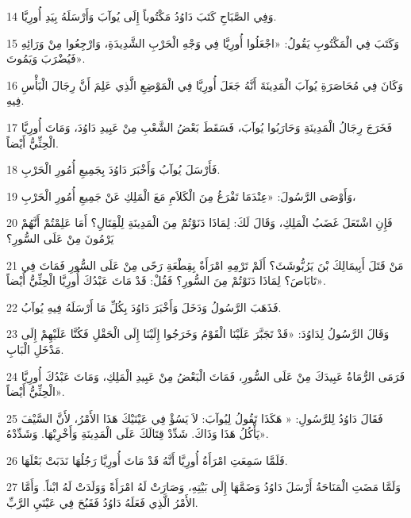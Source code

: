 \par 14 وَفِي الصَّبَاحِ كَتَبَ دَاوُدُ مَكْتُوباً إِلَى يُوآبَ وَأَرْسَلَهُ بِيَدِ أُورِيَّا.
\par 15 وَكَتَبَ فِي الْمَكْتُوبِ يَقُولُ: «اجْعَلُوا أُورِيَّا فِي وَجْهِ الْحَرْبِ الشَّدِيدَةِ، وَارْجِعُوا مِنْ وَرَائِهِ فَيُضْرَبَ وَيَمُوتَ».
\par 16 وَكَانَ فِي مُحَاصَرَةِ يُوآبَ الْمَدِينَةَ أَنَّهُ جَعَلَ أُورِيَّا فِي الْمَوْضِعِ الَّذِي عَلِمَ أَنَّ رِجَالَ الْبَأْسِ فِيهِ.
\par 17 فَخَرَجَ رِجَالُ الْمَدِينَةِ وَحَارَبُوا يُوآبَ، فَسَقَطَ بَعْضُ الشَّعْبِ مِنْ عَبِيدِ دَاوُدَ، وَمَاتَ أُورِيَّا الْحِثِّيُّ أَيْضاً.
\par 18 فَأَرْسَلَ يُوآبُ وَأَخْبَرَ دَاوُدَ بِجَمِيعِ أُمُورِ الْحَرْبِ.
\par 19 وَأَوْصَى الرَّسُولَ: «عِنْدَمَا تَفْرَغُ مِنَ الْكَلاَمِ مَعَ الْمَلِكِ عَنْ جَمِيعِ أُمُورِ الْحَرْبِ،
\par 20 فَإِنِ اشْتَعَلَ غَضَبُ الْمَلِكِ، وَقَالَ لَكَ: لِمَاذَا دَنَوْتُمْ مِنَ الْمَدِينَةِ لِلْقِتَالِ؟ أَمَا عَلِمْتُمْ أَنَّهُمْ يَرْمُونَ مِنْ عَلَى السُّورِ؟
\par 21 مَنْ قَتَلَ أَبِيمَالِكَ بْنَ يَرُبُّوشَثَ؟ أَلَمْ تَرْمِهِ امْرَأَةٌ بِقِطْعَةِ رَحًى مِنْ عَلَى السُّورِ فَمَاتَ فِي تَابَاصَ؟ لِمَاذَا دَنَوْتُمْ مِنَ السُّورِ؟ فَقُلْ: قَدْ مَاتَ عَبْدُكَ أُورِيَّا الْحِثِّيُّ أَيْضاً».
\par 22 فَذَهَبَ الرَّسُولُ وَدَخَلَ وَأَخْبَرَ دَاوُدَ بِكُلِّ مَا أَرْسَلَهُ فِيهِ يُوآبُ.
\par 23 وَقَالَ الرَّسُولُ لِدَاوُدَ: «قَدْ تَجَبَّرَ عَلَيْنَا الْقَوْمُ وَخَرَجُوا إِلَيْنَا إِلَى الْحَقْلِ فَكُنَّا عَلَيْهِمْ إِلَى مَدْخَلِ الْبَابِ.
\par 24 فَرَمَى الرُّمَاةُ عَبِيدَكَ مِنْ عَلَى السُّورِ، فَمَاتَ الْبَعْضُ مِنْ عَبِيدِ الْمَلِكِ، وَمَاتَ عَبْدُكَ أُورِيَّا الْحِثِّيُّ أَيْضاً».
\par 25 فَقَالَ دَاوُدُ لِلرَّسُولِ: « هَكَذَا تَقُولُ لِيُوآبَ: لاَ يَسُؤْ فِي عَيْنَيْكَ هَذَا الأَمْرُ، لأَنَّ السَّيْفَ يَأْكُلُ هَذَا وَذَاكَ. شَدِّدْ قِتَالَكَ عَلَى الْمَدِينَةِ وَأَخْرِبْهَا. وَشَدِّدْهُ».
\par 26 فَلَمَّا سَمِعَتِ امْرَأَةُ أُورِيَّا أَنَّهُ قَدْ مَاتَ أُورِيَّا رَجُلُهَا نَدَبَتْ بَعْلَهَا.
\par 27 وَلَمَّا مَضَتِ الْمَنَاحَةُ أَرْسَلَ دَاوُدُ وَضَمَّهَا إِلَى بَيْتِهِ، وَصَارَتْ لَهُ امْرَأَةً وَوَلَدَتْ لَهُ ابْناً. وَأَمَّا الأَمْرُ الَّذِي فَعَلَهُ دَاوُدُ فَقَبُحَ فِي عَيْنَيِ الرَّبِّ.

